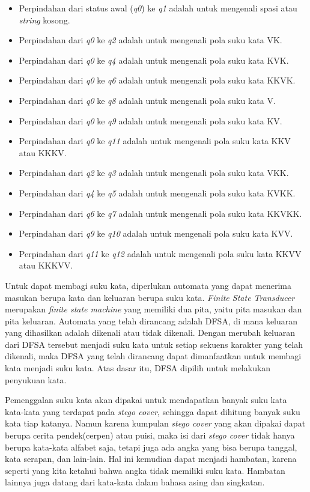 \begin{itemize}
	\item Perpindahan dari status awal (\textit{q0}) ke \textit{q1} adalah untuk mengenali spasi atau \textit{string} kosong.
	\item Perpindahan dari \textit{q0} ke \textit{q2} adalah untuk mengenali pola suku kata VK.
	\item Perpindahan dari \textit{q0} ke \textit{q4} adalah untuk mengenali pola suku kata KVK.
	\item Perpindahan dari \textit{q0} ke \textit{q6} adalah untuk mengenali pola suku kata KKVK.
	\item Perpindahan dari \textit{q0} ke \textit{q8} adalah untuk mengenali pola suku kata V.
	\item Perpindahan dari \textit{q0} ke \textit{q9} adalah untuk mengenali pola suku kata KV.
	\item Perpindahan dari \textit{q0} ke \textit{q11} adalah untuk mengenali pola suku kata KKV atau KKKV.
	\item Perpindahan dari \textit{q2} ke \textit{q3} adalah untuk mengenali pola suku kata VKK.
	\item Perpindahan dari \textit{q4} ke \textit{q5} adalah untuk mengenali pola suku kata KVKK.
	\item Perpindahan dari \textit{q6} ke \textit{q7} adalah untuk mengenali pola suku kata KKVKK.
	\item Perpindahan dari \textit{q9} ke \textit{q10} adalah untuk mengenali pola suku kata KVV.
	\item Perpindahan dari \textit{q11} ke \textit{q12} adalah untuk mengenali pola suku kata KKVV atau KKKVV.
\end{itemize}

Untuk dapat membagi suku kata, diperlukan automata yang dapat menerima masukan berupa kata dan keluaran berupa suku kata. \textit{Finite State Transducer} merupakan \textit{finite state machine} yang memiliki dua pita, yaitu pita masukan dan pita keluaran. Automata yang telah dirancang adalah DFSA, di mana keluaran yang dihasilkan adalah dikenali atau tidak dikenali. Dengan merubah keluaran dari DFSA tersebut menjadi suku kata untuk setiap sekuens karakter yang telah dikenali, maka DFSA yang telah dirancang dapat dimanfaatkan untuk membagi kata menjadi suku kata. Atas dasar itu, DFSA dipilih untuk melakukan penyukuan kata.

Pemenggalan suku kata akan dipakai untuk mendapatkan banyak suku kata kata-kata yang terdapat pada \textit{stego cover}, sehingga dapat dihitung banyak suku kata tiap katanya. Namun karena kumpulan \textit{stego cover} yang akan dipakai dapat berupa cerita pendek(cerpen) atau puisi, maka isi dari \textit{stego cover} tidak hanya berupa kata-kata alfabet saja, tetapi juga ada angka yang bisa berupa tanggal, kata serapan, dan lain-lain. Hal ini kemudian dapat menjadi hambatan, karena seperti yang kita ketahui bahwa angka tidak memiliki suku kata. Hambatan lainnya juga datang dari kata-kata dalam bahasa asing dan singkatan.

